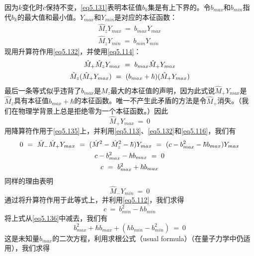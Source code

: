 \documentclass[12pt,a4paper,openany]{ctexbook}
\begin{document}
\begin{flushleft}
因为$k$变化时$c$保持不变，\eqref{eq5.131}表明本征值$b_k$集是有上下界的。令$b_{max}$和$b_{min}$指代$b_k$的最大值和最小值。$Y_{max}$和$Y_{min}$是对应的本征函数：
\begin{align}
    \hat{M}_zY_{max}\ =\ b_{max}Y_{max} \label{eq5.132} \\
    \hat{M}_zY_{min}\ =\ b_{min}Y_{min} \label{eq5.133}
\end{align}
现用升算符作用\eqref{eq5.132}，并使用\eqref{eq5.114}：
\begin{gather}
    \hat{M}_+\hat{M}_zY_{max}\ =\ b_{max}\hat{M}_+Y_{max} \notag \\
    \hat{M}_z(\hat{M}_+Y_{max})\ =\ (b_{max}+\hbar)(\hat{M}_+Y_{max}) \label{eq5.134}
\end{gather}
最后一条等式似乎违背了$b_{max}$是$\hat{M}_z$最大的本征值的声明，因为此式说$\hat{M}_+Y_{max}$是$\hat{M}_z$具有本征值$b_{max}+\hbar$的本征函数。唯一不产生此矛盾的方法是令$\hat{M}_+$消失。（我们在物理学背景上总是拒绝零为一个本征函数。）因此
\begin{equation}
    \hat{M}_+Y_{max}\ =\ 0 \label{eq5.135}
\end{equation}
用降算符作用于\eqref{eq5.135}上，并利用\eqref{eq5.113}、\eqref{eq5.132}和\eqref{eq5.116}，我们有
\begin{gather}
    0\ =\ \hat{M}_-\hat{M}_+Y_{max}\ =\ (\hat{M}^2-\hat{M}_z^2-\hbar)Y_{max}\ =\ (c-b_{max}^2-\hbar b_{max})Y_{max} \notag \\
    c-b_{max}^2-\hbar b_{max}\ =\ 0 \notag \\
    c\ =\ b_{max}^2+\hbar b_{max} \label{eq5.136}
\end{gather}
同样的理由表明
\begin{equation}
    \hat{M}_-Y_{min}\ =\ 0 \label{eq5.137}
\end{equation}
通过将升算符作用于此等式上，并利用\eqref{eq5.112}，我们求得
\begin{equation*}
    c\ =\ b_{min}^2-\hbar b_{min}
\end{equation*}
将上式从\eqref{eq5.136}中减去，我们有
\begin{equation*}
    b_{max}^2+\hbar b_{max}+(\hbar b_{min}-b_{min}^2)\ =\ 0
\end{equation*}
这是未知量$b_{max}$的二次方程，利用求根公式（usual formula）（在量子力学中仍适用），我们求得
\begin{equation*}

\end{equation*}
\end{flushleft}
\end{document}
